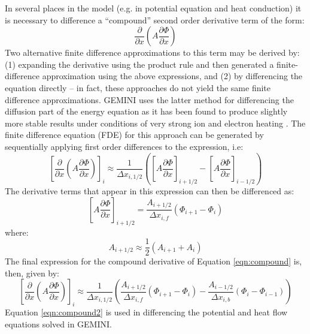 \documentclass[11pt,letterpaper]{article}
\begin{document}
In several places in the model (e.g. in potential equation and heat conduction) it is necessary to difference a ``compound'' second order derivative term of the form:
\begin{equation}
\frac{\partial}{\partial x} \left( A \frac{\partial \Phi}{\partial x} \right) \label{eqn:compound}
\end{equation}
Two alternative finite difference approximations to this term may be derived by:  (1) expanding the derivative using the product rule and then generated a finite-difference approximation using the above expressions, and (2) by differencing the equation directly -- in fact, these approaches do not yield the same finite difference approximations.  GEMINI uses the latter method for differencing the diffusion part of the energy equation as it has been found to produce slightly more stable results under conditions of very strong ion and electron heating \citep[cf.][]{Leveque:2007}.  The finite difference equation (FDE) for this approach can be generated by sequentially applying first order differences to the expression, i.e:
\begin{equation}
\left[ \frac{\partial}{\partial x} \left( A \frac{\partial \Phi}{\partial x} \right) \right]_i \approx \frac{1}{\Delta x_{i,1/2}} \left( \left[ A \frac{\partial \Phi}{\partial x} \right]_{i+1/2} - \left[ A \frac{\partial \Phi}{\partial x} \right]_{i-1/2} \right)
\end{equation}
The derivative terms that appear in this expression can then be differenced as:
\begin{equation}
\left[ A \frac{\partial \Phi}{\partial x} \right]_{i+1/2} = \frac{A_{i+1/2}}{\Delta x_{i,f}} \left( \Phi_{i+1} - \Phi_{i} \right)
\end{equation}
where:
\begin{equation}
A_{i+1/2} \approx \frac{1}{2} \left( A_{i+1} + A_{i} \right)
\end{equation}
The final expression for the compound derivative of Equation \ref{eqn:compound} is, then, given by:
\begin{equation}
\left[ \frac{\partial}{\partial x} \left( A \frac{\partial \Phi}{\partial x} \right) \right]_i \approx \frac{1}{\Delta x_{i,1/2}} \left( \frac{A_{i+1/2}}{\Delta x_{i,f}} \left( \Phi_{i+1} - \Phi_{i} \right) - \frac{A_{i-1/2}}{\Delta x_{i,b}} \left( \Phi_{i} - \Phi_{i-1} \right) \right)
\label{eqn:compound2}
\end{equation}
Equation \ref{eqn:compound2} is used in differencing the potential and heat flow equations solved in GEMINI.
\end{document}
